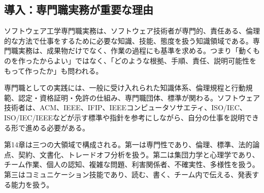 \subsection*{導入：専門職実務が重要な理由}


ソフトウェア工学専門職実務は、ソフトウェア技術者が専門的、責任ある、倫理的な方法で仕事をするために必要な知識、技能、態度を扱う知識領域である。専門職実務は、成果物だけでなく、作業の過程にも基準を求める。つまり「動くものを作ったからよい」ではなく、「どのような根拠、手順、責任、説明可能性をもって作ったか」も問われる。

専門職としての実践には、一般に受け入れられた知識体系、倫理規程と行動規範、認定・資格証明・免許の仕組み、専門職団体、標準が関わる。ソフトウェア技術者は、ACM、IEEE、IFIP、IEEEコンピュータソサエティ、ISO/IEC、ISO/IEC/IEEEなどが示す標準や指針を参考にしながら、自分の仕事を説明できる形で進める必要がある。

第14章は三つの大領域で構成される。第一は専門性であり、倫理、標準、法的論点、契約、文書化、トレードオフ分析を扱う。第二は集団力学と心理学であり、チーム作業、個人の認知、複雑な問題、利害関係者、不確実性、多様性を扱う。第三はコミュニケーション技能であり、読む、書く、チーム内で伝える、発表する能力を扱う。

